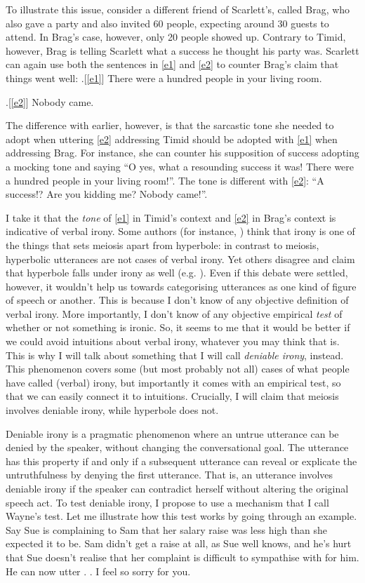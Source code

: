 \documentclass[a4paper,12pt,twoside]{article}
\begin{document}
To illustrate this issue, consider a different friend of Scarlett's, called Brag, who also gave a party and also invited 60 people, expecting around 30 guests to attend. In Brag's case, however, only 20 people showed up. Contrary to Timid, however, Brag is telling Scarlett what a success he thought his party was. Scarlett can again use both the sentences in \ref{e1} and \ref{e2} to counter Brag's claim that things went well:
\ex.[\ref{e1}] There were a hundred people in your living room.

\ex.[\ref{e2}] Nobody came.

The difference with earlier, however, is that the sarcastic tone she needed to adopt when uttering \ref{e2} addressing Timid should be adopted with \ref{e1} when addressing Brag. For instance, she can counter his supposition of success adopting a mocking tone and saying ``O yes, what a resounding success it was! There were a hundred people in your living room!''. The tone is different with \ref{e2}: ``A success!? Are you kidding me? Nobody came!''.

I take it that the {\em tone} of \ref{e1} in Timid's context and \ref{e2} in Brag's context is indicative of verbal irony. Some authors (for instance, \citealt{walton_17}) think that irony is one of the things that sets meiosis apart from hyperbole: in contrast to meiosis, hyperbolic utterances are not cases of verbal irony. Yet others disagree and claim that hyperbole falls under irony as well (e.g. \citealt{gibbs2007}). 
Even if this debate were settled, however, it wouldn't help us towards categorising utterances as one kind of figure of speech or another. This is because I don't know of any objective definition of verbal irony. More importantly, I don't know of any objective empirical {\em test} of whether or not something is ironic. So, it seems to me that it would be better if we could avoid intuitions about verbal irony, whatever you may think that is. This is why I will talk about something that I will call \emph{deniable irony}, instead. This phenomenon covers some (but most probably not all) cases of what people have called (verbal) irony, but importantly it comes with an empirical test, so that we can easily connect it to intuitions. Crucially, I will claim that meiosis involves deniable irony, while hyperbole does not. 

Deniable irony is a pragmatic phenomenon where an untrue utterance can be denied by the speaker, without changing the conversational goal. The utterance has this property if and only if a subsequent utterance can reveal or explicate the untruthfulness by denying the first utterance. That is, an utterance involves deniable irony if the speaker can contradict herself without altering the original speech act. To test deniable irony, I propose to use a mechanism that I call Wayne's test.
Let me illustrate how this test works by going through an example. Say Sue is complaining to Sam that her salary raise was less high than she expected it to be. Sam didn't get a raise at all, as Sue well knows, and he's hurt that Sue doesn't realise that her complaint is difficult to sympathise with for him. He can now utter \Next.
\ex. I feel so sorry for you.
\end{document}
